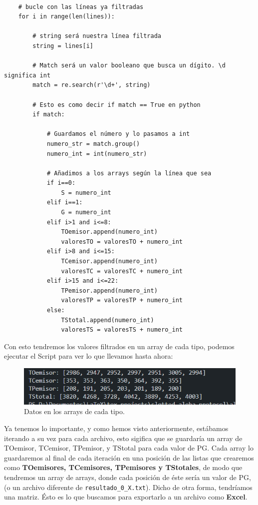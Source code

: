 \documentclass{article}
\begin{document}
\begin{center} 
    \begin{verbatim}

    # bucle con las líneas ya filtradas
    for i in range(len(lines)):

        # string será nuestra línea filtrada
        string = lines[i]

        # Match será un valor booleano que busca un dígito. \d significa int
        match = re.search(r'\d+', string)

        # Esto es como decir if match == True en python
        if match:

            # Guardamos el número y lo pasamos a int
            numero_str = match.group()
            numero_int = int(numero_str)

            # Añadimos a los arrays según la línea que sea
            if i==0:
                S = numero_int
            elif i==1:
                G = numero_int
            elif i>1 and i<=8:
                TOemisor.append(numero_int)
                valoresTO = valoresTO + numero_int
            elif i>8 and i<=15:
                TCemisor.append(numero_int)
                valoresTC = valoresTC + numero_int
            elif i>15 and i<=22:
                TPemisor.append(numero_int)
                valoresTP = valoresTP + numero_int
            else:
                TStotal.append(numero_int)
                valoresTS = valoresTS + numero_int
    \end{verbatim}
    \end{center} 
\quad

Con esto tendremos los valores filtrados en un array de cada tipo, podemos ejecutar el Script para ver lo que llevamos hasta ahora:

\begin{figure}[h]
    \centering
    \includegraphics[width=0.7\linewidth]{src/lineas filtradas2.png}
    \caption{\label{fig:filtradas2} Datos en los arrays de cada tipo.}
\end{figure}

Ya tenemos lo importante, y como hemos visto anteriormente, estábamos iterando a su vez para cada archivo, esto sigifica que se guardaría un array de TOemisor, TCemisor, TPemisor, y TStotal para cada valor de PG. Cada array lo guardaremos al final de cada iteración en una posición de las listas que crearemos como \textbf{TOemisores, TCemisores, TPemisores y TStotales}, de modo que tendremos un array de arrays, donde cada posición de éste sería un valor de PG, (o un archivo diferente de \verb|resultado_0_X.txt|). Dicho de otra forma, tendríamos una matriz. Ésto es lo que buscamos para exportarlo a un archivo como \textbf{Excel}.
\end{document}
